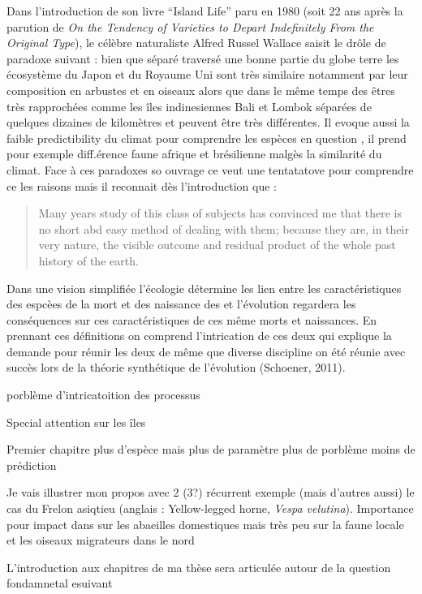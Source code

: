 Dans l'introduction de son livre ``Island Life'' paru en 1980 (soit 22
ans après la parution de \emph{On the Tendency of Varieties to Depart
Indefinitely From the Original Type}), le célèbre naturaliste Alfred
Russel Wallace saisit le drôle de paradoxe suivant : bien que séparé
traversé une bonne partie du globe terre les écosystème du Japon et du
Royaume Uni sont très similaire notamment par leur composition en
arbustes et en oiseaux alors que dans le même temps des êtres très
rapprochées comme les îles indinesiennes Bali et Lombok séparées de
quelques dizaines de kilomètres et peuvent être très différentes. Il
evoque aussi la faible predictibility du climat pour comprendre les
espèces en question , il prend pour exemple diff.érence faune afrique et
brésilienne malgès la similarité du climat. Face à ces paradoxes so
ouvrage ce veut une tentatatove pour comprendre ce les raisons mais il
reconnait dès l'introduction que :

\begin{quote}
Many years study of this class of subjects has convinced me that there
is no short abd easy method of dealing with them; because they are, in
their very nature, the visible outcome and residual product of the whole
past history of the earth.
\end{quote}

Dans une vision simplifiée l'écologie détermine les lien entre les
caractéristiques des espcèes de la mort et des naissance des et
l'évolution regardera les conséquences sur ces caractéristiques de ces
même morts et naissances. En prennant ces définitions on comprend
l'intrication de ces deux qui explique la demande pour réunir les deux
de même que diverse discipline on été réunie avec succès lors de la
théorie synthétique de l'évolution (Schoener, 2011).

porblème d'intricatoition des processus

Special attention sur les îles

Premier chapitre plus d'espèce mais plus de paramètre plus de porblème
moins de prédiction

Je vais illustrer mon propos avec 2 (3?) récurrent exemple (mais
d'autres aussi) le cas du Frelon asiqtieu (anglais : Yellow-legged
horne, \emph{Vespa velutina}). Importance pour impact dans sur les
abaeilles domestiques mais très peu sur la faune locale et les oiseaux
migrateurs dans le nord

L'introduction aux chapitres de ma thèse sera articulée autour de la
question fondamnetal esuivant

